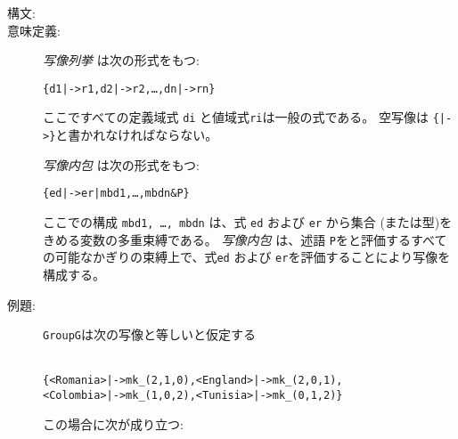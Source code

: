 \documentclass[\pformat,12pt]{jarticle}
\begin{document}
\begin{description}
\item[構文:]

  
  

\item[意味定義:] {\it 写像列挙} は次の形式をもつ:
  \begin{alltt}
    \{d1 |-> r1, d2 |-> r2, \ldots, dn |-> rn\}
  \end{alltt}
  ここですべての定義域式 {\tt di} と値域式{\tt ri}は一般の式である。
 空写像は {\tt \{|->\}}と書かれなければならない。
      
  {\it 写像内包} は次の形式をもつ:
  \begin{alltt}
    \{ed |-> er | mbd1, \ldots, mbdn \& P\}
  \end{alltt}
 ここでの構成 {\tt mbd1, \ldots, mbdn} は、式 {\tt ed} および {\tt er} から集合 (または型)をきめる変数の多重束縛である。
 {\it 写像内包} は、述語 {\tt P}をと評価するすべての可能なかぎりの束縛上で、式{\tt ed} および {\tt er}を評価することにより写像を構成する。

\item[例題:] \texttt{GroupG}は次の写像と等しいと仮定する
  \begin{alltt}\label{GroupGdef}
    \{ <Romania> |-> mk_(2,1,0), <England> |-> mk_(2,0,1),
      <Colombia> |-> mk_(1,0,2), <Tunisia> |-> mk_(0,1,2) \}
  \end{alltt}
  この場合に次が成り立つ:


\end{description}
\end{document}
